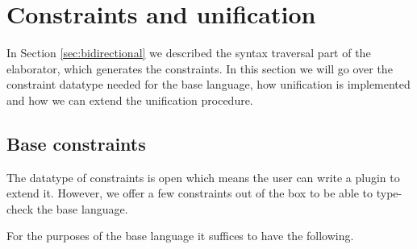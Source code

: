 \documentclass[
  sigconf,
  screen,
  review]{acmart}
\begin{document}
\hypertarget{sec:constraints_and_unification}{%
\section{Constraints and
unification}\label{sec:constraints_and_unification}}

In Section \ref{sec:bidirectional} we described the syntax traversal
part of the elaborator, which generates the constraints. In this section
we will go over the constraint datatype needed for the base language,
how unification is implemented and how we can extend the unification
procedure.

\hypertarget{base-constraints}{%
\subsection{Base constraints}\label{base-constraints}}

The datatype of constraints is open which means the user can write a
plugin to extend it. However, we offer a few constraints out of the box
to be able to type-check the base language.

For the purposes of the base language it suffices to have the following.
\end{document}
